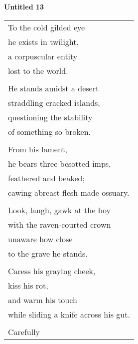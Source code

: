 \documentclass{article}
\begin{document}
\newcommand{\h}{\hspace*{4ex}}

%
%
%
%

\begin{center}
\textbf{Untitled 13} \\ %
\vspace*{2ex}
\begin{longtable}{l}
To the cold gilded eye \\
\h{}he exists in twilight, \\
\h{}a corpuscular entity \\ %
\h{}lost to the world. \\
\\
He stands amidst a desert \\
\h{}straddling cracked islands, \\
\h{}questioning the stability \\
\h{}of something so broken. \\
\\
From his lament, \\
\h{}he bears three besotted imps, \\
\h{}feathered and beaked; \\
\h{}cawing abreast flesh made ossuary. \\
\\
\h{}Look, laugh, gawk at the boy \\
with the raven-courted crown \\
unaware how close \\
to the grave he stands. \\
\\
\h{}Caress his graying cheek, \\
kiss his rot, \\
and warm his touch \\
while sliding a knife across his gut. \\
\\
\h{}Carefully \\

\end{longtable}
\end{center}
\end{document}
